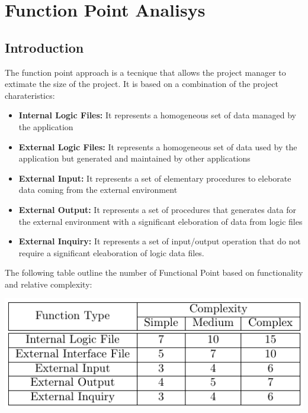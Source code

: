 \documentclass[11pt,titlepage]{article} %
\begin{document}
\section{Function Point Analisys}
  \subsection{Introduction}
    The function point approach is a tecnique that allows the project manager to extimate 
    the size of the project.\newline
    It is based on a combination of the project charateristics:
    \begin{itemize}
     \item \textbf{Internal Logic Files:} It represents a homogeneous set of data managed by the application
     \item \textbf{External Logic Files:} It represents a homogeneous set of data used by the application but generated and maintained by other applications
     \item \textbf{External Input:} It represents a set of elementary procedures to eleborate data coming from the external environment
     \item \textbf{External Output:} It represents a set of procedures that generates data for the external environment with a significant eleboration of data from logic files
     \item \textbf{External Inquiry:} It represents a set of input/output operation that do not require a significant eleaboration of logic data files.
    \end{itemize}
    The following table outline the number of Functional Point based on functionality and relative complexity:\newline
    \begin{center}
      \includegraphics[scale=0.5]{fptable.png}
    \end{center}
\end{document}
